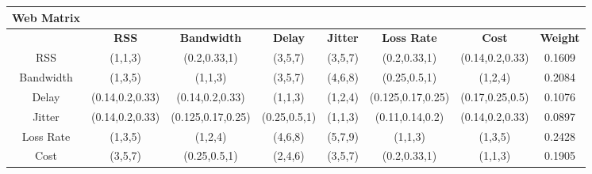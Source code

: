 \documentclass[conference]{IEEEtran}
\begin{document}
\begin{table*}[t]
\begin{center}
{\begin{tabular}{c c c c c c c c}
			
			\textbf{Web Matrix}&&&&&&  \\
			\toprule[2pt]
			&\textbf{RSS}&\textbf{Bandwidth}&\textbf{Delay}&\textbf{Jitter}&\textbf{Loss Rate}&\textbf{Cost} & \textbf{Weight} \\
			\hline
			RSS & (1,1,3) & (0.2,0.33,1) & (3,5,7)& (3,5,7)& (0.2,0.33,1)& (0.14,0.2,0.33)& 0.1609   \\
			Bandwidth & (1,3,5) & (1,1,3) & (3,5,7)& (4,6,8)&(0.25,0.5,1) & (1,2,4) & 0.2084  \\
			Delay & (0.14,0.2,0.33)  & (0.14,0.2,0.33) & (1,1,3)& (1,2,4)& (0.125,0.17,0.25)& (0.17,0.25,0.5) & 0.1076 \\
			Jitter & (0.14,0.2,0.33) &  (0.125,0.17,0.25)& (0.25,0.5,1)& (1,1,3)& (0.11,0.14,0.2)& (0.14,0.2,0.33)& 0.0897  \\
			Loss Rate &(1,3,5)&(1,2,4)&(4,6,8)& (5,7,9)& (1,1,3)& (1,3,5) & 0.2428 \\
			Cost & (3,5,7)&(0.25,0.5,1)& (2,4,6)& (3,5,7)& (0.2,0.33,1)& (1,1,3) & 0.1905 \\
			\hline
		\end{tabular}
	}
		\label{tabdecmtrix}
	\end{center}
\end{table*}

\begin{comment} 

\begin{table*}[t]
	\caption{Network attributes parameters}
	\begin{center}
		\begin{tabular}{c c c c c c c}
			\hline
			\textbf{Network}&\textbf{RRS()}&\textbf{Bandwidth(kbps)}&\textbf{Delay(ms)}&\textbf{Jitter(ms)}&\textbf{Loss Rate(\%)}&\textbf{Cost} \\
			\hline
			UMTS&-95-56&700-2000&10-50&5-15&2-10&5-35   \\
			LTE&-95-56&800-4000&40-80&15-40&6-20&10-45   \\
			WLAN&48-56&1000-8000&70-100&30-70&4-15&0-20  \\
			WiMAX&-95-56&900-6000&50-90&20-50&8-20&15-50    \\
			
			\hline
		\end{tabular}
		\label{tabNetParameters}
	\end{center}
\end{table*}

\end{comment}
\end{document}
